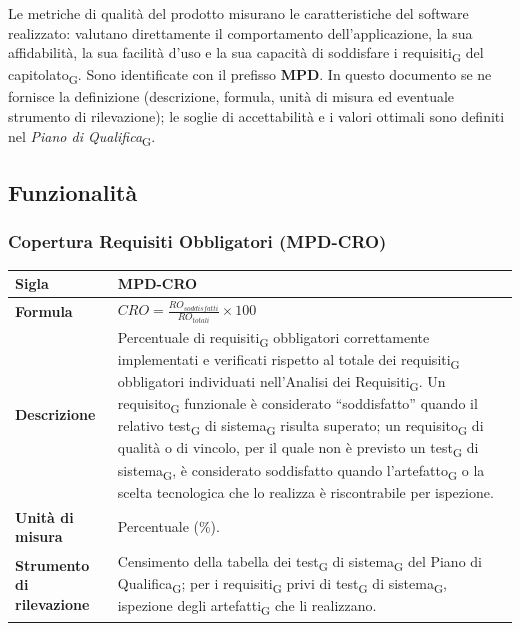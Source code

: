 \documentclass[a4paper, 10pt]{article}
\begin{document}
Le metriche di qualità del prodotto misurano le caratteristiche del software realizzato: valutano direttamente il comportamento dell'applicazione, la sua affidabilità, la sua facilità d'uso e la sua capacità di soddisfare i requisiti\textsubscript{G} del capitolato\textsubscript{G}. Sono identificate con il prefisso \textbf{MPD}. In questo documento se ne fornisce la definizione (descrizione, formula, unità di misura ed eventuale strumento di rilevazione); le soglie di accettabilità e i valori ottimali sono definiti nel \textit{Piano di Qualifica}\textsubscript{G}.

\subsection{Funzionalità}

\subsubsection{Copertura Requisiti Obbligatori (MPD-CRO)}
\noindent
\begin{minipage}{\textwidth}
    \begin{tabularx}{\textwidth}{|>{\columncolor{bluBitless!10}\bfseries}p{3.5cm}|X|}
        \hline
        Sigla & MPD-CRO \\ \hline
        Formula &
        \textit{$CRO = \frac{RO_{soddisfatti}}{RO_{totali}} \times 100$} \\ \hline
        Descrizione & Percentuale di requisiti\textsubscript{G} obbligatori correttamente implementati e verificati rispetto al totale dei requisiti\textsubscript{G} obbligatori individuati nell'Analisi dei Requisiti\textsubscript{G}. Un requisito\textsubscript{G} funzionale è considerato ``soddisfatto'' quando il relativo test\textsubscript{G} di sistema\textsubscript{G} risulta superato; un requisito\textsubscript{G} di qualità o di vincolo, per il quale non è previsto un test\textsubscript{G} di sistema\textsubscript{G}, è considerato soddisfatto quando l'artefatto\textsubscript{G} o la scelta tecnologica che lo realizza è riscontrabile per ispezione. \\ \hline
        Unità di misura & Percentuale (\%). \\ \hline
        Strumento di rilevazione & Censimento della tabella dei test\textsubscript{G} di sistema\textsubscript{G} del Piano di Qualifica\textsubscript{G}; per i requisiti\textsubscript{G} privi di test\textsubscript{G} di sistema\textsubscript{G}, ispezione degli artefatti\textsubscript{G} che li realizzano. \\ \hline
    \end{tabularx}
\end{minipage}
\end{document}
